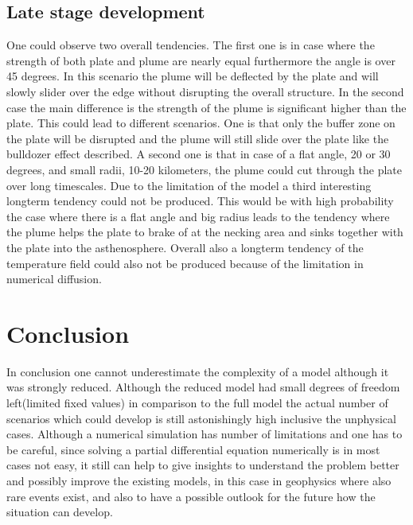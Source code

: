 \documentclass[12pt]{scrreprt}
\begin{document}
\subsection{Late stage development}
One could observe two overall tendencies. The first one is in case where the strength of both plate and plume are nearly equal furthermore the angle is over 45 degrees. In this scenario the plume will be deflected by the plate and will slowly slider over the edge without disrupting the overall structure. In the second case the main difference is the strength of the plume is significant higher than the plate. This could lead to different scenarios. One is that only the buffer zone on the plate will be disrupted and the plume will still slide over the plate like the bulldozer effect described. A second one is that in case of a flat angle, 20 or 30 degrees, and small radii, 10-20 kilometers, the plume could cut through the plate over long timescales. Due to the limitation of the model a third interesting longterm tendency could not be produced. This would be with high probability the case where there is a flat angle and big radius leads to the tendency where the plume helps the plate to brake of at the necking area and sinks together with the plate into the asthenosphere. Overall also a longterm tendency of the temperature field could also not be produced because of the limitation in numerical diffusion.

\section{Conclusion}
In conclusion one cannot underestimate the complexity of a model although it was strongly reduced. Although the reduced model had small degrees of freedom left(limited fixed values) in comparison to the full model the actual number of scenarios which could develop is still astonishingly high inclusive the unphysical cases. Although a numerical simulation has number of limitations and one has to be careful, since solving a partial differential equation numerically is in most cases not easy, it still can help to give insights to understand the problem better and possibly improve the existing models, in this case in geophysics where also rare events exist, and also to have a possible outlook for the future how the situation can develop.

\nocite{vargas2013tearing}
\nocite{gerya2009introduction}




\newpage



\end{document}
